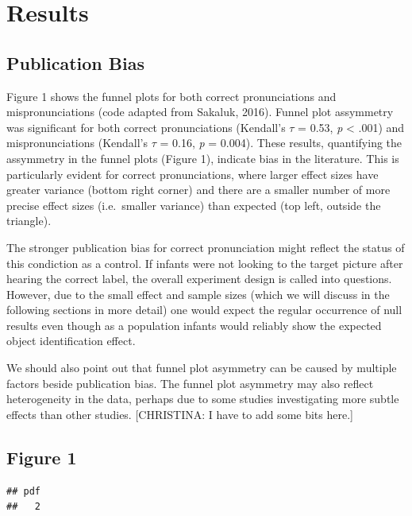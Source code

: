 \documentclass[man]{apa6}
\theoremstyle{definition}
\theoremstyle{definition}
\theoremstyle{definition}
\theoremstyle{remark}
\begin{document}
\section{Results}\label{results}

\subsection{Publication Bias}\label{publication-bias-1}

Figure 1 shows the funnel plots for both correct pronunciations and
mispronunciations (code adapted from Sakaluk, 2016). Funnel plot
assymmetry was significant for both correct pronunciations (Kendall's
\(\tau\) = 0.53, \emph{p} \textless{} .001) and mispronunciations
(Kendall's \(\tau\) = 0.16, \emph{p} = 0.004). These results,
quantifying the assymmetry in the funnel plots (Figure 1), indicate bias
in the literature. This is particularly evident for correct
pronunciations, where larger effect sizes have greater variance (bottom
right corner) and there are a smaller number of more precise effect
sizes (i.e.~smaller variance) than expected (top left, outside the
triangle).

The stronger publication bias for correct pronunciation might reflect
the status of this condiction as a control. If infants were not looking
to the target picture after hearing the correct label, the overall
experiment design is called into questions. However, due to the small
effect and sample sizes (which we will discuss in the following sections
in more detail) one would expect the regular occurrence of null results
even though as a population infants would reliably show the expected
object identification effect.

We should also point out that funnel plot asymmetry can be caused by
multiple factors beside publication bias. The funnel plot asymmetry may
also reflect heterogeneity in the data, perhaps due to some studies
investigating more subtle effects than other studies. {[}CHRISTINA: I
have to add some bits here.{]}

\subsection{Figure 1}\label{figure-1}

\begin{verbatim}
## pdf 
##   2
\end{verbatim}
\end{document}

